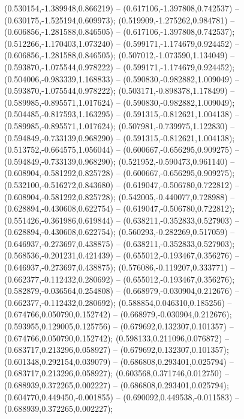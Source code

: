  (0.530154,-1.389948,0.866219) -- (0.617106,-1.397808,0.742537) -- (0.630175,-1.525194,0.609973);
 (0.519909,-1.275262,0.984781) -- (0.606856,-1.281588,0.846505) -- (0.617106,-1.397808,0.742537);
 (0.512266,-1.170403,1.073240) -- (0.599171,-1.174679,0.924452) -- (0.606856,-1.281588,0.846505);
 (0.507012,-1.073590,1.134049) -- (0.593870,-1.075544,0.978222) -- (0.599171,-1.174679,0.924452);
 (0.504006,-0.983339,1.168833) -- (0.590830,-0.982882,1.009049) -- (0.593870,-1.075544,0.978222);
 (0.503171,-0.898378,1.178499) -- (0.589985,-0.895571,1.017624) -- (0.590830,-0.982882,1.009049);
 (0.504485,-0.817593,1.163295) -- (0.591315,-0.812621,1.004138) -- (0.589985,-0.895571,1.017624);
 (0.507981,-0.739975,1.122830) -- (0.594849,-0.733139,0.968290) -- (0.591315,-0.812621,1.004138);
 (0.513752,-0.664575,1.056044) -- (0.600667,-0.656295,0.909275) -- (0.594849,-0.733139,0.968290);
 (0.521952,-0.590473,0.961140) -- (0.608904,-0.581292,0.825728) -- (0.600667,-0.656295,0.909275);
 (0.532100,-0.516272,0.843680) -- (0.619047,-0.506780,0.722812) -- (0.608904,-0.581292,0.825728);
 (0.542005,-0.440077,0.728988) -- (0.628894,-0.430608,0.622754) -- (0.619047,-0.506780,0.722812);
 (0.551426,-0.361986,0.619844) -- (0.638211,-0.352833,0.527903) -- (0.628894,-0.430608,0.622754);
 (0.560293,-0.282269,0.517059) -- (0.646937,-0.273697,0.438875) -- (0.638211,-0.352833,0.527903);
 (0.568536,-0.201231,0.421439) -- (0.655012,-0.193467,0.356276) -- (0.646937,-0.273697,0.438875);
 (0.576086,-0.119207,0.333771) -- (0.662377,-0.112432,0.280692) -- (0.655012,-0.193467,0.356276);
 (0.582879,-0.036564,0.254808) -- (0.668979,-0.030904,0.212676) -- (0.662377,-0.112432,0.280692);
 (0.588854,0.046310,0.185256) -- (0.674766,0.050790,0.152742) -- (0.668979,-0.030904,0.212676);
 (0.593955,0.129005,0.125756) -- (0.679692,0.132307,0.101357) -- (0.674766,0.050790,0.152742);
 (0.598133,0.211096,0.076872) -- (0.683717,0.213296,0.058927) -- (0.679692,0.132307,0.101357);
 (0.601348,0.292154,0.039079) -- (0.686808,0.293401,0.025794) -- (0.683717,0.213296,0.058927);
 (0.603568,0.371746,0.012750) -- (0.688939,0.372265,0.002227) -- (0.686808,0.293401,0.025794);
 (0.604770,0.449450,-0.001855) -- (0.690092,0.449538,-0.011583) -- (0.688939,0.372265,0.002227);

